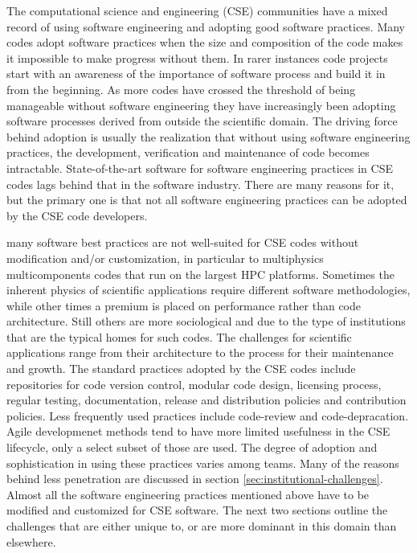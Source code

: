 The computational science and engineering (CSE) communities have a mixed record
of using software engineering and adopting good software
practices. Many codes adopt software practices when the size
and composition of the code makes it impossible to make progress
without them. In rarer instances code projects start with an awareness
of the importance of software process and build it in from the
beginning. As more codes have crossed the threshold of being
manageable without software engineering they have increasingly been  
adopting software processes derived from outside the scientific
domain. The driving force behind adoption is usually the realization
that without using software engineering practices, the development,
verification and maintenance of code becomes
intractable. State-of-the-art software for software engineering
practices in CSE codes lags behind that in the software
industry. There are many reasons for it, but the primary one is that
not all software engineering practices can be adopted by the CSE code
developers. 

many software best practices are not well-suited for CSE codes without
modification and/or customization, in particular to multiphysics
multicomponents codes that run on the largest HPC platforms. Sometimes
the inherent physics of scientific applications require different
software methodologies, while other times a premium is placed on
performance rather than code architecture.  Still others are more
sociological and due to the type of institutions that are the typical
homes for such codes. The challenges for scientific applications range
from their architecture to the process for their maintenance and
growth. The standard practices adopted by the CSE codes include
repositories for code version control, modular code design, licensing
process, regular testing, documentation, release and distribution
policies and contribution policies. Less frequently used practices
include code-review and code-depracation. Agile developmenet methods
tend to have more limited usefulness in the CSE lifecycle, only a
select subset of those are used. The degree of adoption and
sophistication in using these  practices varies among teams. Many of
the reasons behind less penetration are discussed in section
\ref{sec:institutional-challenges}. Almost all the software
engineering practices mentioned above have to be modified and
customized for CSE software. The next two sections outline the
challenges that are either unique to, or are more dominant in this
domain than elsewhere. 



